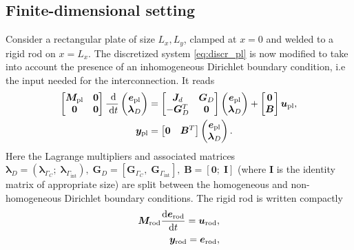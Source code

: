 \documentclass[letterpaper, 10 pt, conference]{ieeeconf}
\begin{document}
\subsection{Finite-dimensional setting}
Consider a rectangular plate of size $L_x, L_y$, clamped at $x=0$ and welded to a rigid rod on $x=L_x$. The discretized system \eqref{eq:discr_pl} is now modified to take into account the presence of an inhomogeneous Dirichlet boundary condition, i.e the input needed for the interconnection. It reads
\begin{equation}
\begin{aligned}
\begin{bmatrix}
\bm{M}_{\text{pl}} & \bm{0} \\
\bm{0} & \bm{0} \\
\end{bmatrix}\frac{\d}{\d t}
\begin{pmatrix}
\bm{e}_{\text{pl}}\\
\bm{\lambda}_D \\
\end{pmatrix}
&= \begin{bmatrix}
\bm{J}_d & \bm{G}_D \\
-\bm{G}_D^T & \bm{0} \\
\end{bmatrix}
\begin{pmatrix}
\bm{e}_{\text{pl}}\\
\bm{\lambda}_D \\
\end{pmatrix} + \begin{bmatrix}
\bm{0} \\
\bm{B} \\
\end{bmatrix} \bm{u}_{\text{pl}}, \\
\bm{y}_{\text{pl}} &= \begin{bmatrix}
\bm{0} & \bm{B}^T \\
\end{bmatrix} \begin{pmatrix}
\bm{e}_{\text{pl}}\\
\bm{\lambda}_D \\
\end{pmatrix}.
\end{aligned} 
\end{equation}
Here the Lagrange multipliers and associated matrices $\bm{\lambda}_D =  (\bm\lambda_{\Gamma_{C}}; \; \bm\lambda_{\Gamma_{\text{int}}} ), \; \bm{G}_D = [\bm{G}_{\Gamma_{C}}, \; \bm{G}_{\Gamma_{\text{int}}}], \; \bm{B} = [\bm{0}; \; \bm{I}]$ (where $\bm{I}$ is the identity matrix of appropriate size) are split between the homogeneous and non-homogeneous Dirichlet boundary conditions. The rigid rod is written compactly 
\begin{equation}
\begin{aligned}
\bm{M}_{\text{rod}} \diff{\bm{e}_{\text{rod}}}{t} = \bm{u}_{\text{rod}}, \\
\bm{y}_{\text{rod}} = \bm{e}_{\text{rod}},
\end{aligned}
\end{equation}
\end{document}
